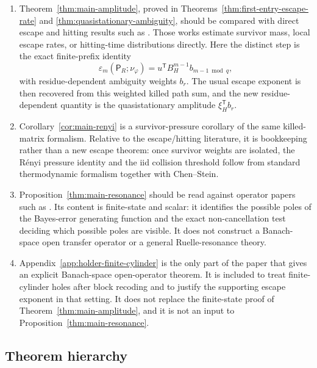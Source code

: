 \begin{enumerate}[label=(\roman*)]
  \item Theorem~\ref{thm:main-amplitude}, proved in
  Theorems~\ref{thm:first-entry-escape-rate} and
  \ref{thm:quasistationary-ambiguity}, should be compared with direct
  escape and hitting results such as
  \citet{BruinDemersTodd2018,HaydnYang2020,DemersTodd2021}.  Those works
  estimate survivor mass, local escape rates, or hitting-time
  distributions directly.  Here the distinct step is the exact
  finite-prefix identity
  \[
    \varepsilon_m(\mathsf P_R;\nu_\varphi)
    =u^{\mathsf T}B_H^{m-1}b_{m-1\bmod q},
  \]
  with residue-dependent ambiguity weights \(b_r\).  The usual escape
  exponent is then recovered from this weighted killed path sum, and the
  new residue-dependent quantity is the quasistationary amplitude
  \(\xi_H^{\mathsf T}b_r\).
  \item Corollary~\ref{cor:main-renyi} is a survivor-pressure corollary
  of the same killed-matrix formalism.  Relative to the escape/hitting
  literature, it is bookkeeping rather than a new escape theorem: once
  survivor weights are isolated, the R\'enyi pressure identity and the
  iid collision threshold follow from standard thermodynamic formalism
  together with Chen--Stein.
  \item Proposition~\ref{thm:main-resonance} should be read against
  operator papers such as
  \citet{KellerLiverani2009,FroylandStancevic2010,AtnipFroylandGonzalezTokmanVaienti2023}.
  Its content is finite-state and scalar: it identifies the possible
  poles of the Bayes-error generating function and the exact
  non-cancellation test deciding which possible poles are visible.  It
  does not construct a Banach-space open transfer operator or a general
  Ruelle-resonance theory.
  \item Appendix~\ref{app:holder-finite-cylinder} is the only part of
  the paper that gives an explicit Banach-space open-operator theorem.
  It is included to treat finite-cylinder holes after block recoding and
  to justify the supporting escape exponent in that setting.  It does
  not replace the finite-state proof of
  Theorem~\ref{thm:main-amplitude}, and it is not an input to
  Proposition~\ref{thm:main-resonance}.
\end{enumerate}

\subsection*{Theorem hierarchy}

